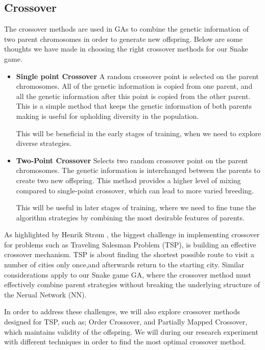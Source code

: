 \documentclass[a4paper, twocolumn]{article}
\begin{document}
\subsection{Crossover\label{sec:Crossover}}
The crossover methods are used in GAs to combine the genetic information of two parent chromosomes in order to generate new offspring. Below are some thoughts we have made in choosing the right crossover methods for our Snake game.

\begin{itemize}
    \item \textbf{Single point Crossover}
A random crossover point is selected on the parent chromosomes. All of the genetic information is copied from one parent, and all the genetic information after this point is copied from the other parent. This is a  simple method that keeps the genetic information of both parents making is useful for upholding diversity in the population. 

This will be beneficial in the early stages of training, when we need to explore diverse strategies. 
\end{itemize}


\begin{itemize}
    \item \textbf{Two-Point Crossover}
Selects two random crossover point on the parent chromosomes. The genetic information is interchanged between the parents to create two new offspring. This method provides a higher level of mixing compared to single-point crossover, which can lead to more varied breeding. 

This will be useful in later stages of training, where we need to fine tune the algorithm strategies by combining the most desirable features of parents. 
\end{itemize}

As highlighted by Henrik Strøm \cite{strom2024travelling}, the biggest challenge in implementing crossover for problems such as Traveling Salesman Problem (TSP), is building an effective crossover mechanism. TSP is about finding the shortest possible route to visit a number of cities only once,and afterwards return to the starting city.
Similar considerations apply to our Snake game GA, where the crossover method must effectively combine parent strategies without breaking the underlying structure of the Nerual Network (NN).

In order to address these challenges, we will also explore crossover methods designed for TSP, such as; Order Crossover, and Partially Mapped Crossover, which maintains validity of the offspring. We will during our research experiment with different techniques in order to find the most optimal crossover method.  
\end{document}
